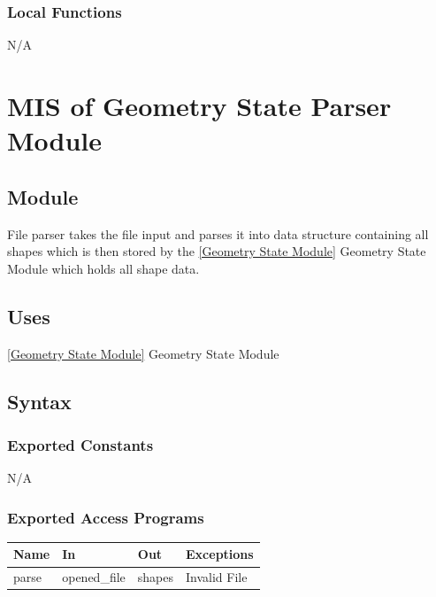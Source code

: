 \documentclass[12pt, titlepage]{article}
\begin{document}
\subsubsection{Local Functions}
N/A

\newpage
\section{MIS of {Geometry State Parser Module}} \label{Geometry State Parser Module}
%
%

\subsection{Module}

File parser takes the file input and parses it into data structure containing all shapes which is then stored by the \ref{Geometry State Module} {Geometry State Module} which holds all shape data.

\subsection{Uses}

\ref{Geometry State Module} {Geometry State Module}

\subsection{Syntax}

\subsubsection{Exported Constants}
N/A
\subsubsection{Exported Access Programs}

\begin{center}
\begin{tabular}{p{2cm} p{4cm} p{4cm} p{2cm}}
\hline
\textbf{Name} & \textbf{In} & \textbf{Out} & \textbf{Exceptions} \\
\hline
{parse} & opened\_file & shapes & Invalid File \\
\hline
\end{tabular}
\end{center}
\end{document}
